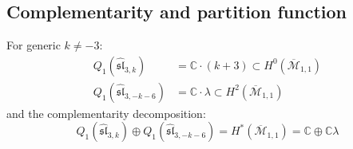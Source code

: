 \subsection{Complementarity and partition function}

\begin{theorem}
\label{thm:sl3-genus1-complementarity}
For generic $k \neq -3$:
\begin{align}
Q_1(\widehat{\mathfrak{sl}}_{3,k}) &= \mathbb{C} \cdot (k+3) \subset H^0(\overline{\mathcal{M}}_{1,1}) \label{eq:Q1-sl3} \\
Q_1(\widehat{\mathfrak{sl}}_{3,-k-6}) &= \mathbb{C} \cdot \lambda \subset H^2(\overline{\mathcal{M}}_{1,1}) \label{eq:Q1-sl3-dual}
\end{align}
and the complementarity decomposition:
\begin{equation}\label{eq:sl3-complementarity}
Q_1(\widehat{\mathfrak{sl}}_{3,k}) \oplus Q_1(\widehat{\mathfrak{sl}}_{3,-k-6}) = H^*(\overline{\mathcal{M}}_{1,1}) = \mathbb{C} \oplus \mathbb{C}\lambda
\end{equation}
\end{theorem}

